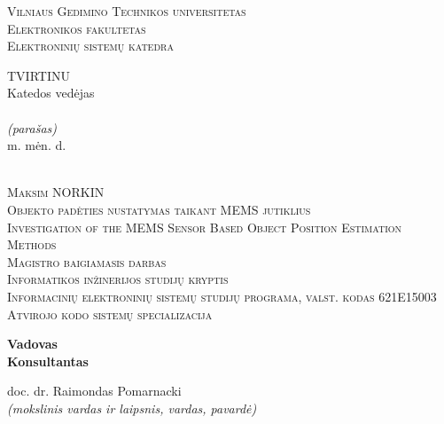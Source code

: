 \documentclass[]{vgtuef}
\begin{document}
  \begin{titlepage}
    \setcounter{page}{7}
    \thispagestyle{plain}
    \begin{center}
      \textsc{\Large Vilniaus Gedimino Technikos universitetas}\\
      \textsc{\Large Elektronikos fakultetas}\\
      \textsc{\Large Elektroninių sistemų katedra}\\[10mm]
      \hfill
      \begin{minipage}{.35\linewidth}
        \begin{flushleft}
          \uppercase{Tvirtinu}\\
          Katedos vedėjas\\[5mm]
          \makebox[1.8in]{\hrulefill}\\
          \scriptsize{\textit{(parašas)}}\\
          \normalsize{\the\year m. \makebox[0.45in]{\hrulefill} mėn. \makebox[0.15in]{\hrulefill} d.}\\
        \end{flushleft}
      \end{minipage}\\[10mm]
      \textsc{\Large Maksim NORKIN}\\[1mm]
      \textsc{\Large Objekto padėties nustatymas taikant MEMS jutiklius}\\[15mm]
      \textsc{\Large Investigation of the MEMS Sensor Based Object Position Estimation Methods}\\[10mm]
      \textsc{\large Magistro baigiamasis darbas}\\[10mm]
      \textsc{Informatikos inžinerijos studijų kryptis}\\
      \textsc{Informacinių elektroninių sistemų studijų programa, valst. kodas 621E15003}\\
      \textsc{Atvirojo kodo sistemų specializacija}\\
    \end{center}
    \begin{flushright}
      \begin{minipage}[t]{.17\linewidth}
          \textbf{Vadovas}\\[3mm]
          \textbf{Konsultantas}
      \end{minipage}
      \begin{minipage}[t]{.4\linewidth}
        doc. dr. Raimondas Pomarnacki \\
        \scriptsize{\textit{(mokslinis vardas ir laipsnis, vardas, pavardė)}} \\

\end{minipage}
\end{flushright}
\end{titlepage}
\end{document}
